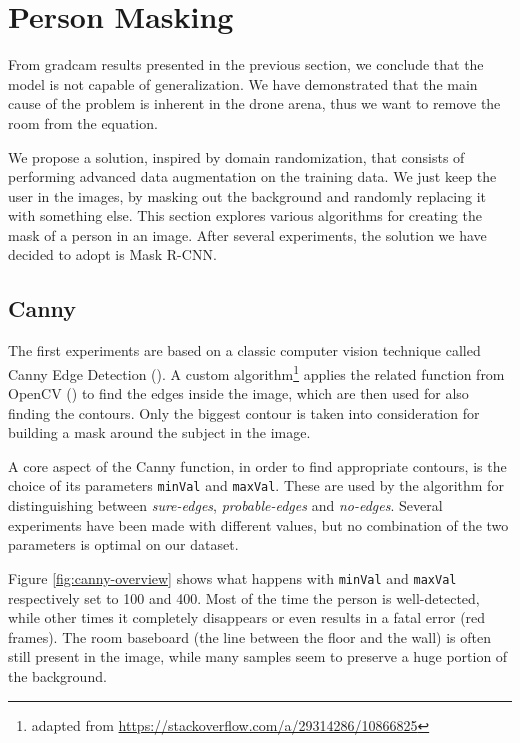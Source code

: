 \section{Person Masking}
\label{sec:masking}

From \gls{gradcam} results presented in the previous section, we conclude that the model is not capable of generalization. We have demonstrated that the main cause of the problem is inherent in the drone arena, thus we want to remove the room from the equation.

We propose a solution, inspired by domain randomization, that consists of performing advanced data augmentation on the training data. We just keep the user in the images, by masking out the background and randomly replacing it with something else. This section explores various algorithms for creating the mask of a person in an image. After several experiments, the solution we have decided to adopt is Mask R-CNN.



\subsection{Canny}
\label{subsec:masking-canny}

The first experiments are based on a classic computer vision technique called Canny Edge Detection (\cite{canny1986}). A custom algorithm\footnote{adapted from \url{https://stackoverflow.com/a/29314286/10866825}} applies the related function from OpenCV (\cite{opencv_canny}) to find the edges inside the image, which are then used for also finding the contours. Only the biggest contour is taken into consideration for building a mask around the subject in the image.

\medskip

A core aspect of the Canny function, in order to find appropriate contours, is the choice of its parameters \texttt{minVal} and \texttt{maxVal}. These are used by the algorithm for distinguishing between \textit{sure-edges}, \textit{probable-edges} and \textit{no-edges}. Several experiments have been made with different values, but no combination of the two parameters is optimal on our dataset.

Figure \ref{fig:canny-overview} shows what happens with \texttt{minVal} and \texttt{maxVal} respectively set to 100 and 400. Most of the time the person is well-detected, while other times it completely disappears or even results in a fatal error (red frames). The room baseboard (the line between the floor and the wall) is often still present in the image, while many samples seem to preserve a huge portion of the background.

